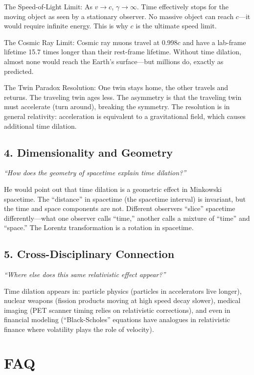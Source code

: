 \documentclass[11pt,openright]{book}
\begin{document}
The Speed-of-Light Limit: As $v \to c$, $\gamma \to \infty$. Time effectively stops for the moving object as seen by a stationary observer. No massive object can reach $c$---it would require infinite energy. This is why $c$ is the ultimate speed limit.

The Cosmic Ray Limit: Cosmic ray muons travel at 0.998$c$ and have a lab-frame lifetime 15.7 times longer than their rest-frame lifetime. Without time dilation, almost none would reach the Earth's surface---but millions do, exactly as predicted.

The Twin Paradox Resolution: One twin stays home, the other travels and returns. The traveling twin ages less. The asymmetry is that the traveling twin must accelerate (turn around), breaking the symmetry. The resolution is in general relativity: acceleration is equivalent to a gravitational field, which causes additional time dilation.

\subsection*{4. Dimensionality and Geometry}
\textit{``How does the geometry of spacetime explain time dilation?''}

He would point out that time dilation is a geometric effect in Minkowski spacetime. The ``distance'' in spacetime (the spacetime interval) is invariant, but the time and space components are not. Different observers ``slice'' spacetime differently---what one observer calls ``time,'' another calls a mixture of ``time'' and ``space.'' The Lorentz transformation is a rotation in spacetime.

\subsection*{5. Cross-Disciplinary Connection}
\textit{``Where else does this same relativistic effect appear?''}

Time dilation appears in: particle physics (particles in accelerators live longer), nuclear weapons (fission products moving at high speed decay slower), medical imaging (PET scanner timing relies on relativistic corrections), and even in financial modeling (``Black-Scholes'' equations have analogues in relativistic finance where volatility plays the role of velocity).
\section*{FAQ}
\end{document}
